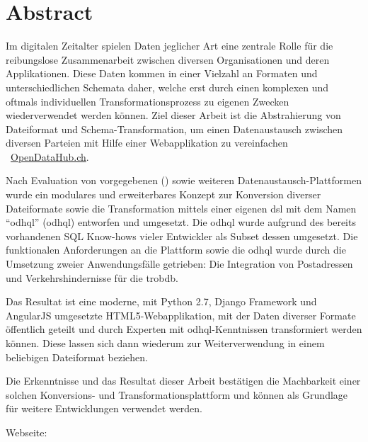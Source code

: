 \begin{comment}
2.1.2 Abstract
Ein Abstract ist eine rein textuelle kurze Zusammenfassung der Arbeit. Der Abstract ist für die Recherche in grossen Dokumentensammlungen geeignet. Er umfasst nie mehr als eine Seite, typisch sogar nur etwa 200 Worte (etwa 20 Zeilen).
Der Begriff ‚Kurzfassung’ ist zuwenig genau definiert; er soll wenn möglich vermieden werden.
\end{comment}


{}
\chapter*{Abstract}

Im digitalen Zeitalter spielen Daten jeglicher Art eine zentrale Rolle für die reibungslose Zusammenarbeit zwischen diversen Organisationen und deren Applikationen. Diese Daten kommen in einer Vielzahl an Formaten und unterschiedlichen Schemata daher, welche erst durch einen komplexen und oftmals individuellen Transformationsprozess zu eigenen Zwecken wiederverwendet werden können. Ziel dieser Arbeit ist die Abstrahierung von Dateiformat und Schema-Transformation, um einen Datenaustausch zwischen diversen Parteien mit Hilfe einer Webapplikation zu vereinfachen \textendash\ \href{http://beta.opendatahub.ch/}{OpenDataHub.ch}.

\medskip
Nach Evaluation von vorgegebenen () sowie weiteren Datenaustausch-Plattformen wurde ein modulares und erweiterbares Konzept zur Konversion diverser Dateiformate sowie die Transformation mittels einer eigenen \gls{dsl} mit dem Namen ``\acl{odhql}'' (\acs{odhql}) entworfen und umgesetzt. Die \acs{odhql} wurde aufgrund des bereits vorhandenen SQL Know-hows vieler Entwickler als Subset dessen umgesetzt. Die funktionalen Anforderungen an die Plattform sowie die \acs{odhql} wurde durch die Umsetzung zweier Anwendungsfälle getrieben: Die Integration von Postadressen und Verkehrshindernisse für die \gls{trobdb}.

\medskip
Das Resultat ist eine moderne, mit Python 2.7, Django Framework und AngularJS umgesetzte HTML5-Webapplikation, mit der Daten diverser Formate öffentlich geteilt und durch Experten mit \acs{odhql}-Kenntnissen transformiert werden können. Diese lassen sich dann wiederum zur Weiterverwendung in einem beliebigen Dateiformat beziehen.

\medskip
Die Erkenntnisse und das Resultat dieser Arbeit bestätigen die Machbarkeit einer solchen Konversions- und Transformationsplattform und können als Grundlage für weitere Entwicklungen verwendet werden.

\bigskip
Webseite: 


\glsresetall